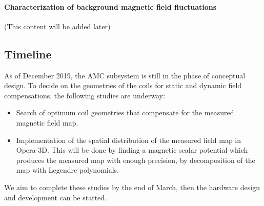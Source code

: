 
\paragraph*{Characterization of background magnetic field fluctuations}
(This content will be added later)



\subsection{Timeline}
As of December 2019, the AMC subsystem is still in the phase of conceptual design. To decide on the geometries of the coils for static and dynamic field compensations, the following studies are underway:
\begin{itemize}
\item Search of optimum coil geometries that compensate for the measured magnetic field map.
\item Implementation of the spatial distribution of the measured field map in Opera-3D. This will be done by finding a magnetic scalar potential which produces the measured map with enough precision, by decomposition of the map with Legendre polynomials. 
\end{itemize}
We aim to complete these studies by the end of March, then the hardware design and development can be started.




